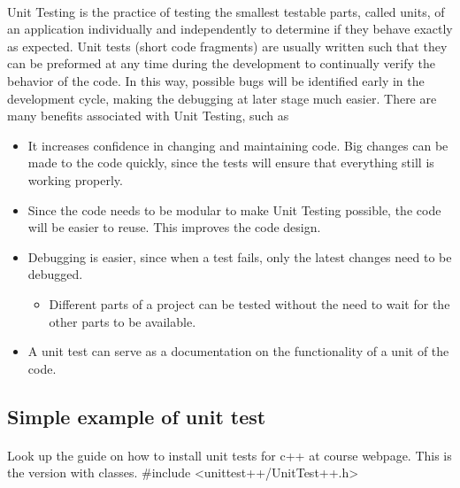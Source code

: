 \documentclass[%
oneside,                 %
final,                   %
10pt]{article}
\begin{document}
{{{{{{{{{{{{{{{{\paragraph{}
Unit Testing is the practice of testing the smallest testable parts,
called units, of an application individually and independently to
determine if they behave exactly as expected. Unit tests (short code
fragments) are usually written such that they can be preformed at any
time during the development to continually verify the behavior of the
code. In this way, possible bugs will be identified early in the
development cycle, making the debugging at later stage much
easier. There are many benefits associated with Unit Testing, such as
\begin{itemize}
  \item It increases confidence in changing and maintaining code. Big changes can be made to the code quickly, since the tests will ensure that everything still is working properly.

  \item Since the code needs to be modular to make Unit Testing possible, the code will be easier to reuse. This improves the code design.

  \item Debugging is easier, since when a test fails, only the latest changes need to be debugged.
\begin{itemize}

   \item Different parts of a project can be tested without the need to wait for the other parts to be available.

\end{itemize}

\noindent
  \item A unit test can serve as a documentation on the functionality of a unit of the code.
\end{itemize}

\noindent




\subsection{Simple example of unit test}

\paragraph{}
Look up the guide on how to install unit tests for c++ at course webpage. This is the version with classes.
\bcppcod
#include <unittest++/UnitTest++.h>

}}}}}}}}}}}}}}}}
\end{document}
